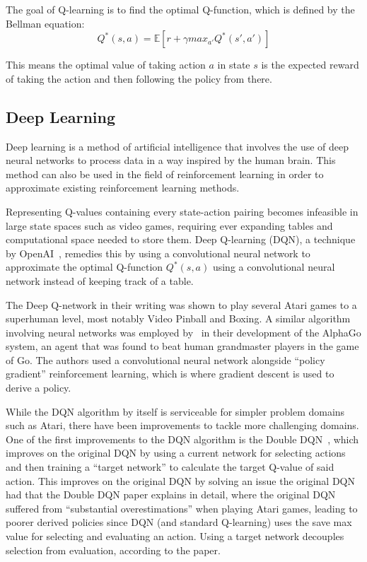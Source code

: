\documentclass[12pt,a4paper]{article}
\begin{document}
    The goal of Q-learning is to find the optimal Q-function, which is defined by the Bellman equation:
    \[Q^{*}(s, a) = \mathbb{E} [r + \gamma max_{a'} Q^{*}(s', a')]\]

    This means the optimal value of taking action \(a\) in state \(s\) is the expected reward of taking the action and then following the policy from there.

    \subsection{Deep Learning}\label{subsec:deep-learning}
    Deep learning is a method of artificial intelligence that involves the use of deep neural networks to process data in a way inspired by the human brain.
    This method can also be used in the field of reinforcement learning in order to approximate existing reinforcement learning methods.

    Representing Q-values containing every state-action pairing becomes infeasible in large state spaces such as video
    games, requiring ever expanding tables and computational space needed to store them.
    Deep Q-learning (DQN), a technique by OpenAI~\citep{mnih15}, remedies this by using a convolutional neural network to
    approximate the optimal Q-function \(Q^*(s, a)\) using a convolutional neural network instead of keeping track of
    a table.

    The Deep Q-network in their writing was shown to play several Atari games to a superhuman level, most notably Video Pinball and Boxing.
    A similar algorithm involving neural networks was employed by~\citet{silver16} in their development of the AlphaGo system, an agent that was found to beat human grandmaster players in the game of Go.
    The authors used a convolutional neural network alongside ``policy gradient'' reinforcement learning, which is where gradient descent is used to derive a policy.

    While the DQN algorithm by itself is serviceable for simpler problem domains such as Atari, there have been improvements to tackle more challenging domains.
    One of the first improvements to the DQN algorithm is the Double DQN~\citep{hasselt15}, which improves on the original DQN by using a current network for selecting actions
    and then training a ``target network'' to calculate the target Q-value of said action.
    This improves on the original DQN by solving an issue the original DQN had that the Double DQN paper explains in detail,
    where the original DQN suffered from ``substantial overestimations'' when playing Atari games, leading to poorer derived policies since
    DQN (and standard Q-learning) uses the save max value for selecting and evaluating an action.
    Using a target network decouples selection from evaluation, according to the paper.
\end{document}
